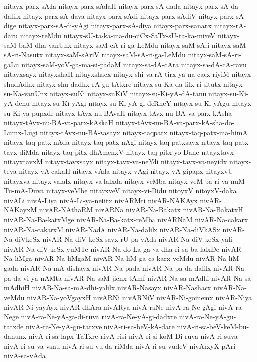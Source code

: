{nitayx-parx-sAda
nitayx-parx-sAdaH
nitayx-parx-sA-dada
nitayx-parx-sA-da-dalilx
nitayx-parx-sA-dava
nitayx-parx-sAdi
nitayx-parx-sAdiV
nitayx-parx-sA-dige
nitayx-parx-sA-di-yAgi
nitayx-parx-sA-diya
nitayx-parx-sananx
nitayx-rA-daru
nitayx-reMdu
nitayx-sU-ta-ka-ma-du-ciCx-SaTx-sU-ta-ka-miveV
nitayx-saM-baM-dha-vanUnx
nitayx-saM-cA-ri-ga-LeMdu
nitayx-saM-sAri
nitayx-saM-sA-ri-Nasutx
nitayx-saM-sAriV
nitayx-saM-sA-ri-ga-LeMdu
nitayx-saM-sA-ri-gaLu
nitayx-saM-yoV-ga-ma-si-padaM
nitayx-sa-dA-cAra
nitayx-sa-dA-cA-ravu
nitayxsayx
nitayxshaH
nitayxshacx
nitayx-shi-va-rA-tirx-ya-na-cacx-riyiM
nitayx-shudAdhx
nitayx-shu-dadhx-rA-gu-tAtxre
nitayx-su-Ka-da-lilx-ri-situtx
nitayx-su-Ka-vanUnx
nitayx-suKi
nitayx-suKiV
nitayx-su-Ki-yA-dA-tanu
nitayx-su-Ki-yA-denu
nitayx-su-Ki-yAgi
nitayx-su-Ki-yA-gi-deRneY
nitayx-su-Ki-yAgu
nitayx-su-Ki-ya-pupxde
nitayx-tAvx-nu-BAvaH
nitayx-tAvx-nu-BA-va-parx-kAsha
nitayx-tAvx-nu-BA-va-parx-kAshaH
nitayx-tAvx-nu-BA-va-parx-kA-sha-do-Lumx-Lugi
nitayx-tAvx-nu-BA-vasayx
nitayx-taqpatx
nitayx-taq-patx-ma-himA
nitayx-taq-patx-nAda
nitayx-taq-patx-nAgi
nitayx-taq-patxsayx
nitayx-taq-patx-tavx-diMda
nitayx-taq-pitx-dhAmenxV
nitayx-taq-pitx-yo-Dane
nitayxtavx
nitayxtavxM
nitayx-tavxsayx
nitayx-tavx-va-neYdi
nitayx-tavx-va-neyidx
nitayx-teya
nitayx-vA-cakaH
nitayx-vAda
nitayx-vAgi
nitayx-vA-gipapx
nitayxvU
nitayxva
nitayx-valalx
nitayx-va-lalxda
nitayx-veMba
nitayx-veM-ba-ri-va-nuM-Tu-mA-Duva
nitayx-veMbe
nitayxveV
nitayx-vi-Didu
nitoyxV
nitoyxV-daka
nivALi
nivA-Liya
nivA-Li-ya-netitx
nivARMti
nivAR-NAKAyx
nivAR-NAKayxM
nivAR-NAthaRM
nivARNa
nivAR-Na-Bakatx
nivAR-Na-BakatxH
nivAR-Na-Ba-katxMge
nivAR-Na-Ba-katx-reMba
nivARNaM
nivAR-Na-cakarx
nivAR-Na-cakarxM
nivAR-NadA
nivAR-Na-dalilx
nivAR-Na-diVkASx
nivAR-Na-diVkeSx
nivAR-Na-diV-keSx-savx-rU-pa-vAda
nivAR-Na-diV-keSx-yali
nivAR-Na-diV-keSx-yuMTe
nivAR-Na-do-La-ga-va-dha-ri-sa-ba-lalxDe
nivAR-Na-liMga
nivAR-Na-liMgaM
nivAR-Na-liM-ga-ca-karx-veMdu
nivAR-Na-liM-gada
nivAR-Na-mA-dishayx
nivAR-Na-pada
nivAR-Na-pa-da-dalilx
nivAR-Na-pa-da-vi-ya-nAMta
nivAR-Na-saM-jicnx-tAmf
nivAR-Na-sa-mAdhi
nivAR-Na-sa-mAdhiH
nivAR-Na-sa-mA-dhi-yalilx
nivAR-Nasayx
nivAR-Nashacx
nivAR-Na-veMdu
nivAR-Na-yoVgayxH
nivARNi
nivARNiV
nivAR-Ni-gomemx
nivAR-Niya
nivAR-Ni-yayAyx
nivAR-dhAra
nivARya
nivA-raNe
nivA-ra-Ne-gAgi
nivA-ra-Nege
nivA-ra-Ne-yA-ga-di-ruva
nivA-ra-Ne-yA-gi-dadxre
nivA-ra-Ne-yA-gu-tatxde
nivA-ra-Ne-yA-gu-tatxve
nivA-ri-sa-beV-kA-dare
nivA-ri-sa-beV-keM-bu-danunx
nivA-ri-sa-lapx-TaTxre
nivA-risi
nivA-ri-si-koM-Di-ruva
nivA-ri-suva
nivA-ri-su-va-vanu
nivA-ri-su-vu-da-riMda
nivA-ri-su-vudeV
nivArxyX-pAri
nivA-sa-vAda
}
